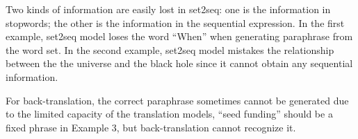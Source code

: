 Two kinds of information are easily lost in set2seq: 
one is the information in stopwords; the other is the information in the 
sequential expression. 
In the first example, set2seq model loses the word ``When'' 
when generating paraphrase from the word set. 
In the second example, set2seq model mistakes the relationship between the 
the universe and the black hole since it cannot obtain any sequential information. 

For back-translation, the correct paraphrase sometimes cannot be 
generated due to the limited capacity of the translation models, 
``seed funding'' should be a fixed phrase in Example 3, 
but back-translation cannot recognize it.


